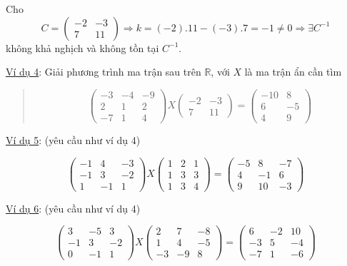 \documentclass[
]{article}
\let\ul\uline
\begin{document}
Cho $$C = \begin{pmatrix} -2 & -3 \\ 7 & 11 \end{pmatrix} \Rightarrow k = (-2).11 - (-3).7 = -1 \neq 0 \Rightarrow \exists C^{-1}$$ không khả
nghịch và không tồn tại
$C^{-1}$.

\ul{Ví dụ 4}: Giải phương trình ma trận sau trên
$\mathbb{R}$, với
$X$ là ma trận ẩn
cần tìm

\begin{quote}
$$\begin{pmatrix} -3 & -4 & -9 \\ 2 & 1 & 2 \\ -7 & 1 & 4 \end{pmatrix} X \begin{pmatrix} -2 & -3 \\ 7 & 11 \end{pmatrix} = \begin{pmatrix} -10 & 8 \\ 6 & -5 \\ 4 & 9 \end{pmatrix}$$
\end{quote}

\ul{Ví dụ 5}: (yêu cầu như ví dụ 4)

$$\begin{pmatrix} -1 & 4 & -3 \\ -1 & 3 & -2 \\ 1 & -1 & 1 \end{pmatrix} X \begin{pmatrix} 1 & 2 & 1 \\ 1 & 3 & 3 \\ 1 & 3 & 4 \end{pmatrix} = \begin{pmatrix} -5 & 8 & -7 \\ 4 & -1 & 6 \\ 9 & 10 & -3 \end{pmatrix}$$

\ul{Ví dụ 6}: (yêu cầu như ví dụ 4)

$$\begin{pmatrix} 3 & -5 & 3 \\ -1 & 3 & -2 \\ 0 & -1 & 1 \end{pmatrix} X \begin{pmatrix} 2 & 7 & -8 \\ 1 & 4 & -5 \\ -3 & -9 & 8 \end{pmatrix} = \begin{pmatrix} 6 & -2 & 10 \\ -3 & 5 & -4 \\ -7 & 1 & -6 \end{pmatrix}$$
\end{document}

